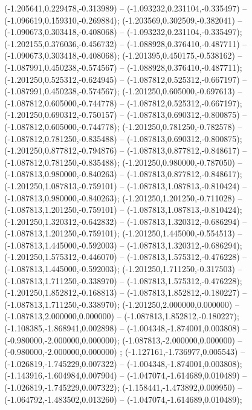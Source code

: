  (-1.205641,0.229478,-0.313989) -- (-1.093232,0.231104,-0.335497) -- (-1.096619,0.159310,-0.269884);
 (-1.203569,0.302509,-0.382041) -- (-1.090673,0.303418,-0.408068) -- (-1.093232,0.231104,-0.335497);
 (-1.202155,0.376036,-0.456732) -- (-1.088928,0.376410,-0.487711) -- (-1.090673,0.303418,-0.408068);
 (-1.201395,0.450175,-0.538162) -- (-1.087991,0.450238,-0.574567) -- (-1.088928,0.376410,-0.487711);
 (-1.201250,0.525312,-0.624945) -- (-1.087812,0.525312,-0.667197) -- (-1.087991,0.450238,-0.574567);
 (-1.201250,0.605000,-0.697613) -- (-1.087812,0.605000,-0.744778) -- (-1.087812,0.525312,-0.667197);
 (-1.201250,0.690312,-0.750157) -- (-1.087813,0.690312,-0.800875) -- (-1.087812,0.605000,-0.744778);
 (-1.201250,0.781250,-0.782578) -- (-1.087812,0.781250,-0.835488) -- (-1.087813,0.690312,-0.800875);
 (-1.201250,0.877812,-0.794876) -- (-1.087813,0.877812,-0.848617) -- (-1.087812,0.781250,-0.835488);
 (-1.201250,0.980000,-0.787050) -- (-1.087813,0.980000,-0.840263) -- (-1.087813,0.877812,-0.848617);
 (-1.201250,1.087813,-0.759101) -- (-1.087813,1.087813,-0.810424) -- (-1.087813,0.980000,-0.840263);
 (-1.201250,1.201250,-0.711028) -- (-1.087813,1.201250,-0.759101) -- (-1.087813,1.087813,-0.810424);
 (-1.201250,1.320312,-0.642832) -- (-1.087813,1.320312,-0.686294) -- (-1.087813,1.201250,-0.759101);
 (-1.201250,1.445000,-0.554513) -- (-1.087813,1.445000,-0.592003) -- (-1.087813,1.320312,-0.686294);
 (-1.201250,1.575312,-0.446070) -- (-1.087813,1.575312,-0.476228) -- (-1.087813,1.445000,-0.592003);
 (-1.201250,1.711250,-0.317503) -- (-1.087813,1.711250,-0.338970) -- (-1.087813,1.575312,-0.476228);
 (-1.201250,1.852812,-0.168813) -- (-1.087813,1.852812,-0.180227) -- (-1.087813,1.711250,-0.338970);
 (-1.201250,2.000000,0.000000) -- (-1.087813,2.000000,0.000000) -- (-1.087813,1.852812,-0.180227);
 (-1.108385,-1.868941,0.002898) -- (-1.004348,-1.874001,0.003808) -- (-0.980000,-2.000000,0.000000);
 (-1.087813,-2.000000,0.000000) -- (-0.980000,-2.000000,0.000000) ;
 (-1.127161,-1.736977,0.005543) -- (-1.026819,-1.745229,0.007322) -- (-1.004348,-1.874001,0.003808);
 (-1.143916,-1.604984,0.007904) -- (-1.047074,-1.614689,0.010489) -- (-1.026819,-1.745229,0.007322);
 (-1.158441,-1.473892,0.009950) -- (-1.064792,-1.483502,0.013260) -- (-1.047074,-1.614689,0.010489);
